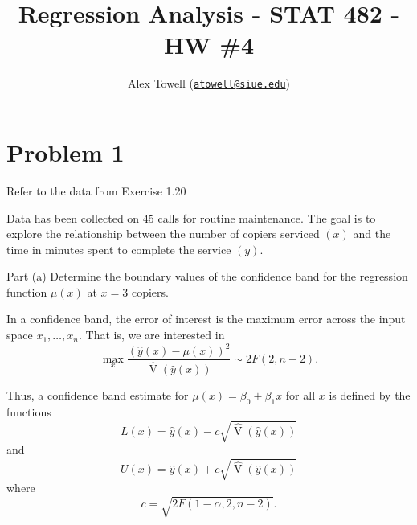 \documentclass[
]{article}
\title{Regression Analysis - STAT 482 - HW \#4}
\author{Alex Towell
(\href{mailto:atowell@siue.edu}{\nolinkurl{atowell@siue.edu}})}
\date{}
\begin{document}
\maketitle

\newcommand{\ssto}{\operatorname{SSTO}}
\newcommand{\ssx}{\operatorname{SS_X}}
\newcommand{\ssr}{\operatorname{SS_R}}
\newcommand{\msr}{\operatorname{MS_R}}
\newcommand{\mse}{\operatorname{MS_E}}
\newcommand{\var}{\operatorname{V}}
\newcommand{\sd}{\operatorname{sd}}
\newcommand{\expect}{\operatorname{E}}
\newcommand{\corr}{\operatorname{cor}}
\newcommand{\cov}{\operatorname{cov}}
\newcommand{\se}{\operatorname{se}}
\newcommand{\mat}[1]{\mathbf{#1}}
\newcommand{\eval}[2]{\left. #1 \right\vert_{#2}}

\hypertarget{problem-1}{%
\section{Problem 1}\label{problem-1}}

Refer to the data from Exercise 1.20

Data has been collected on \(45\) calls for routine maintenance. The
goal is to explore the relationship between the number of copiers
serviced \((x)\) and the time in minutes spent to complete the service
\((y)\).

\begin{tcolorbox}[split=\f]
Part (a)
\tcblower
Determine the boundary values of the confidence band for the regression function
$\mu(x)$ at $x=3$ copiers.
\end{tcolorbox}

In a confidence band, the error of interest is the maximum error across
the input space \(x_1,\ldots,x_n\). That is, we are interested in \[
  \max_x \frac{\left(\hat{y}(x)-\mu(x)\right)^2}{\hat{\operatorname{V}}(\hat{y}(x))} \sim 2 F(2,n-2).
\]

Thus, a confidence band estimate for \(\mu(x) = \beta_0 + \beta_1 x\)
for all \(x\) is defined by the functions \[
  L(x) = \hat{y}(x) - c \sqrt{\hat{\operatorname{V}}(\hat{y}(x))}
\] and \[
  U(x) = \hat{y}(x) + c \sqrt{\hat{\operatorname{V}}(\hat{y}(x))}
\] where \[
  c = \sqrt{2 F(1-\alpha,2,n-2)}.
\]
\end{document}
